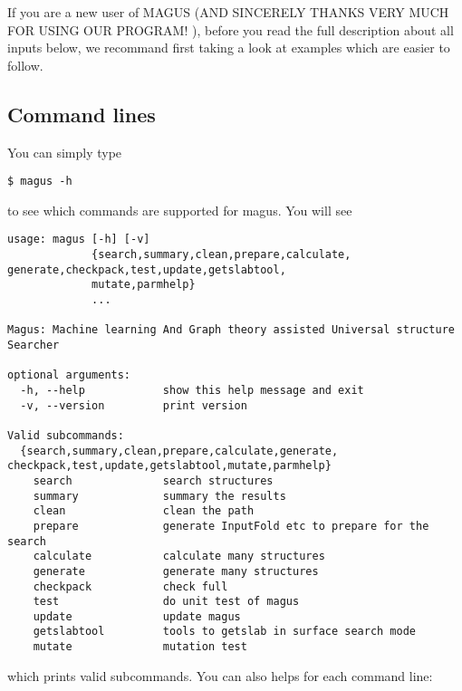 \documentclass[12pt,oneside]{book}
\begin{document}
If you are a new user of MAGUS (AND SINCERELY THANKS VERY MUCH FOR USING OUR PROGRAM! ), before you read the full description about all inputs below, we recommand first taking a look at examples which are easier to follow. 

\subsection{Command lines}
You can simply type
\begin{tcolorbox}
    \begin{verbatim}
$ magus -h
    \end{verbatim}
\end{tcolorbox}
to see which commands are supported for magus. You will see
\begin{tcolorbox}
    \begin{verbatim}
usage: magus [-h] [-v]
             {search,summary,clean,prepare,calculate, generate,checkpack,test,update,getslabtool,
             mutate,parmhelp}
             ...

Magus: Machine learning And Graph theory assisted Universal structure Searcher

optional arguments:
  -h, --help            show this help message and exit
  -v, --version         print version

Valid subcommands:
  {search,summary,clean,prepare,calculate,generate, checkpack,test,update,getslabtool,mutate,parmhelp}
    search              search structures
    summary             summary the results
    clean               clean the path
    prepare             generate InputFold etc to prepare for the search
    calculate           calculate many structures
    generate            generate many structures
    checkpack           check full
    test                do unit test of magus
    update              update magus
    getslabtool         tools to getslab in surface search mode
    mutate              mutation test
    \end{verbatim}
\end{tcolorbox}
which prints valid subcommands. You can also helps for each command line:
\end{document}
